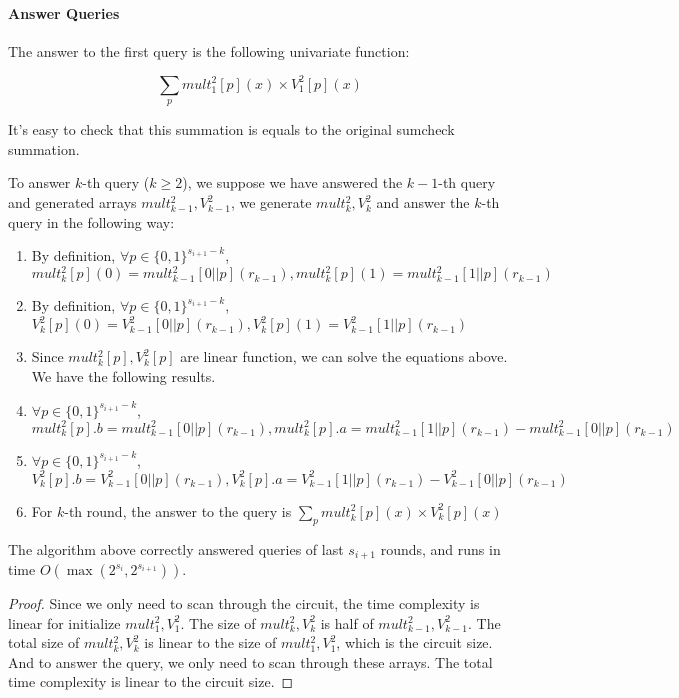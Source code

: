{{{	\paragraph*{Answer Queries}
	The answer to the first query is the following univariate function:
	
	$$\sum_{p}mult_{1}^2[p](x)\times V_1^2[p](x)$$
	
	It's easy to check that this summation is equals to the original sumcheck summation.
	
	To answer $k$-th query ($k\ge 2$), we suppose we have answered the $k-1$-th query and generated arrays $mult_{k-1}^2, V_{k-1}^2$, we generate $mult_{k}^2, V_{k}^2$ and answer the $k$-th query in the following way:
	
	\begin{enumerate}
		\item By definition, $\forall p \in {\{0, 1\}^{s_{i+1}-k}}$, $mult_{k}^2[p](0)=mult_{k-1}^2[0||p](r_{k-1}), mult_{k}^2[p](1)=mult_{k-1}^2[1||p](r_{k-1})$
		\item By definition, $\forall p \in {\{0, 1\}^{s_{i+1}-k}}$, $V_{k}^2[p](0)=V_{k-1}^2[0||p](r_{k-1}), V_{k}^2[p](1)=V_{k-1}^2[1||p](r_{k-1})$
		\item Since $mult_{k}^2[p], V_{k}^2[p]$ are linear function, we can solve the equations above. We have the following results.
		\item $\forall p \in {\{0, 1\}^{s_{i+1}-k}}$, $mult_{k}^2[p].b = mult_{k-1}^2[0||p](r_{k-1}), mult_{k}^2[p].a = mult_{k-1}^2[1||p](r_{k-1})-mult_{k-1}^2[0||p](r_{k-1})$
		\item $\forall p \in {\{0, 1\}^{s_{i+1}-k}}$, $V_{k}^2[p].b = V_{k-1}^2[0||p](r_{k-1}), V_{k}^2[p].a = V_{k-1}^2[1||p](r_{k-1})-V_{k-1}^2[0||p](r_{k-1})$
		\item For $k$-th round, the answer to the query is $\sum_{p} mult_{k}^2[p](x)\times V_{k}^2[p](x)$
	\end{enumerate}
	
	\begin{theorem} The algorithm above correctly answered queries of last $s_{i+1}$ rounds, and runs in time $O(\max(2^{s_{i}}, 2^{s_{i+1}}))$.
	\end{theorem}
	
	\begin{proof}
		Since we only need to scan through the circuit, the time complexity is linear for initialize $mult_{1}^2, V_1^2$. The size of $mult_{k}^2, V_k^2$ is half of $mult_{k-1}^2, V_{k-1}^2$. The total size of $mult_{k}^2, V_k^2$ is linear to the size of $mult_1^2, V_1^2$, which is the circuit size. And to answer the query, we only need to scan through these arrays. The total time complexity is linear to the circuit size.
		

\end{proof}}}}
